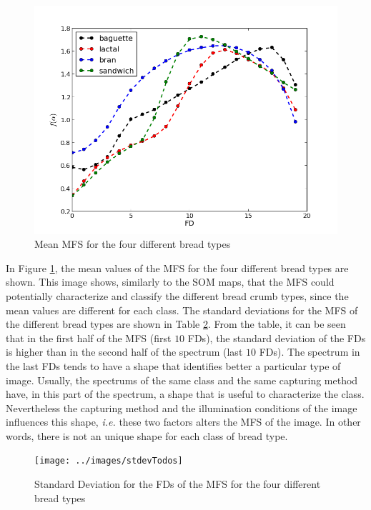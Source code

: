 \begin{figure}[htb]
\centering
\includegraphics[scale=0.4]{../images/means}
\caption{Mean MFS for the four different bread types}
\label{fig:meansMFS}
\end{figure}


In Figure \ref{fig:meansMFS}, the mean values of the MFS for the four different bread types are shown. This image shows, similarly to the SOM maps, that the MFS could potentially characterize and classify the different bread crumb types, since the mean values are different for each class. The standard deviations for the MFS of the different bread types are shown in Table \ref{fig:stdevMFS}. From the table, it can be seen that in the first half of the MFS (first $10$ FDs), the standard deviation of the FDs is higher than in the second half of the spectrum (last $10$ FDs). The spectrum in the last FDs tends to have a shape that identifies better a particular type of image. Usually, the spectrums of the same class and the same capturing method have, in this part of the spectrum, a shape that is useful to characterize the class. Nevertheless the capturing method and the illumination conditions of the image influences this shape, {\em i.e.} these two factors alters the MFS of the image. In other words, there is not an unique shape for each class of bread type.


\begin{figure}[htb]
\centering
\texttt{[image: ../images/stdevTodos]}
\caption{Standard Deviation for the FDs of the MFS for the four different bread types}
\label{fig:stdevMFS}
\end{figure}


